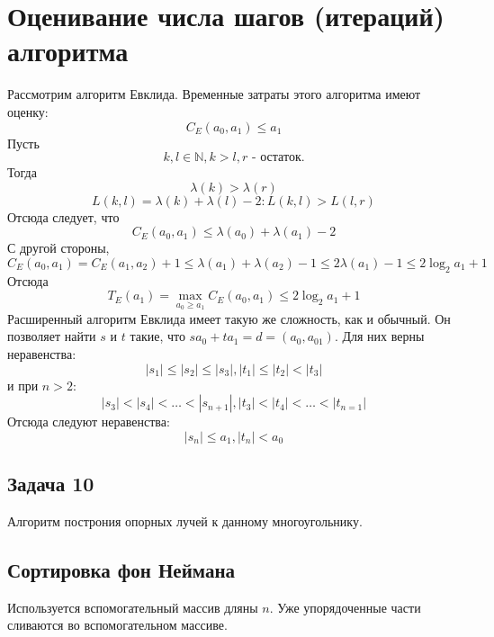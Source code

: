 \documentclass[11pt]{article}
\newcounter{th}\setcounter{th}{0}
\begin{document}
\section{Оценивание числа шагов (итераций) алгоритма}
\label{sec:orgac4d056}
Рассмотрим алгоритм Евклида. Временные затраты этого алгоритма имеют оценку:
\begin{equation}
C_E(a_0, a_1) \leq a_1
\end{equation}
Пусть
\begin{equation}
k, l \in \mathbb{N}, k > l, r \text{ - остаток.}
\end{equation}
Тогда
\begin{equation}
\lambda(k) > \lambda(r)
\end{equation}
\begin{equation}
L(k, l) = \lambda(k) + \lambda(l) - 2: L(k, l) > L(l, r)
\end{equation}
Отсюда следует, что
\begin{equation}
C_E(a_0, a_1) \leq \lambda(a_0) + \lambda(a_1) - 2
\end{equation}
С другой стороны,
\begin{equation}
C_E(a_0, a_1) = C_E(a_1, a_2) + 1 \leq \lambda(a_1) + \lambda(a_2) - 1 \leq 2\lambda(a_1) - 1
\leq 2\log_2a_1 + 1
\end{equation}
Отсюда
\begin{equation}
T_E(a_1) = \max_{a_0 \geq a_1}C_E(a_0, a_1) \leq 2\log_2a_1 + 1
\end{equation}
Расширенный алгоритм Евклида имеет такую же сложность, как и обычный. Он позволяет найти
$s$ и $t$ такие, что $sa_0 + ta_1 = d = (a_0, a_01)$. Для них верны неравенства:
\begin{equation}
|s_1| \leq |s_2| \leq |s_3|, |t_1| \leq |t_2| < |t_3|
\end{equation}
и при $n > 2$:
\begin{equation}
|s_3| < |s_4| < \ldots < |s_{n + 1}|, |t_3| < |t_4| < \ldots < |t_{n = 1}|
\end{equation}
Отсюда следуют неравенства:
\begin{equation}
|s_n| \leq a_1, |t_n| < a_0
\end{equation}
\subsection{Задача 10}
\label{sec:orgddb6d54}
Алгоритм построния опорных лучей к данному многоугольнику.
\subsection{Сортировка фон Неймана}
\label{sec:orgb673729}
Используется вспомогательный массив дляны \(n\). Уже упорядоченные части сливаются во
вспомогательном массиве.
\end{document}
